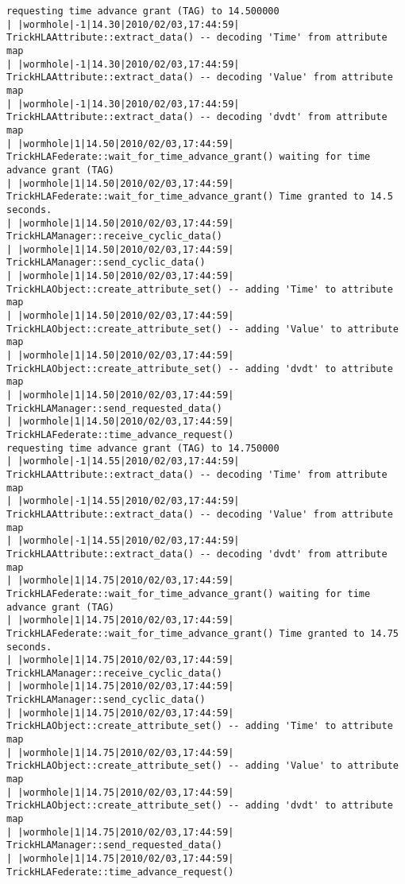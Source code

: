 \begin{lstlisting}[numbers=none,caption={output showing conditionally sent cyclic data}]
requesting time advance grant (TAG) to 14.500000
| |wormhole|-1|14.30|2010/02/03,17:44:59| TrickHLAAttribute::extract_data() -- decoding 'Time' from attribute map
| |wormhole|-1|14.30|2010/02/03,17:44:59| TrickHLAAttribute::extract_data() -- decoding 'Value' from attribute map
| |wormhole|-1|14.30|2010/02/03,17:44:59| TrickHLAAttribute::extract_data() -- decoding 'dvdt' from attribute map
| |wormhole|1|14.50|2010/02/03,17:44:59| TrickHLAFederate::wait_for_time_advance_grant() waiting for time advance grant (TAG)
| |wormhole|1|14.50|2010/02/03,17:44:59| TrickHLAFederate::wait_for_time_advance_grant() Time granted to 14.5 seconds.
| |wormhole|1|14.50|2010/02/03,17:44:59| TrickHLAManager::receive_cyclic_data()
| |wormhole|1|14.50|2010/02/03,17:44:59| TrickHLAManager::send_cyclic_data()
| |wormhole|1|14.50|2010/02/03,17:44:59| TrickHLAObject::create_attribute_set() -- adding 'Time' to attribute map
| |wormhole|1|14.50|2010/02/03,17:44:59| TrickHLAObject::create_attribute_set() -- adding 'Value' to attribute map
| |wormhole|1|14.50|2010/02/03,17:44:59| TrickHLAObject::create_attribute_set() -- adding 'dvdt' to attribute map
| |wormhole|1|14.50|2010/02/03,17:44:59| TrickHLAManager::send_requested_data()
| |wormhole|1|14.50|2010/02/03,17:44:59| TrickHLAFederate::time_advance_request()   
requesting time advance grant (TAG) to 14.750000
| |wormhole|-1|14.55|2010/02/03,17:44:59| TrickHLAAttribute::extract_data() -- decoding 'Time' from attribute map
| |wormhole|-1|14.55|2010/02/03,17:44:59| TrickHLAAttribute::extract_data() -- decoding 'Value' from attribute map
| |wormhole|-1|14.55|2010/02/03,17:44:59| TrickHLAAttribute::extract_data() -- decoding 'dvdt' from attribute map
| |wormhole|1|14.75|2010/02/03,17:44:59| TrickHLAFederate::wait_for_time_advance_grant() waiting for time advance grant (TAG)
| |wormhole|1|14.75|2010/02/03,17:44:59| TrickHLAFederate::wait_for_time_advance_grant() Time granted to 14.75 seconds.
| |wormhole|1|14.75|2010/02/03,17:44:59| TrickHLAManager::receive_cyclic_data()
| |wormhole|1|14.75|2010/02/03,17:44:59| TrickHLAManager::send_cyclic_data()
| |wormhole|1|14.75|2010/02/03,17:44:59| TrickHLAObject::create_attribute_set() -- adding 'Time' to attribute map
| |wormhole|1|14.75|2010/02/03,17:44:59| TrickHLAObject::create_attribute_set() -- adding 'Value' to attribute map
| |wormhole|1|14.75|2010/02/03,17:44:59| TrickHLAObject::create_attribute_set() -- adding 'dvdt' to attribute map
| |wormhole|1|14.75|2010/02/03,17:44:59| TrickHLAManager::send_requested_data()
| |wormhole|1|14.75|2010/02/03,17:44:59| TrickHLAFederate::time_advance_request()   

\end{lstlisting}
